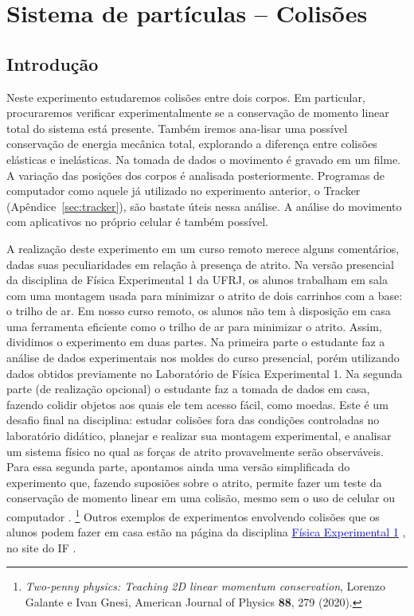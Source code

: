 
\chapter{Sistema de partículas -- Colisões}
\label{chap:colisao}
\vspace{-0.7cm}



\section{Introdução}
Neste experimento estudaremos colisões entre dois corpos. Em particular, procuraremos verificar experimentalmente se a conservação de momento linear total do sistema está presente. Também iremos ana-lisar uma possível conservação de energia mecânica total, explorando a diferença entre colisões elásticas e inelásticas. Na tomada de dados o movimento é gravado em um filme. A variação das posições dos corpos é analisada posteriormente. Programas de computador como aquele já utilizado no experimento anterior, o Tracker 
(Apêndice~\ref{sec:tracker}), são bastate úteis nessa análise. A análise do movimento com aplicativos no próprio celular é também possível.

A realização deste experimento em um curso remoto merece alguns comentários, dadas suas peculiaridades em relação à presença de atrito. Na versão presencial da disciplina de Física Experimental 1 da UFRJ, os alunos trabalham em sala com uma montagem usada para minimizar o atrito de dois carrinhos com a base: o trilho de ar. Em nosso curso remoto, os alunos não tem à disposição em casa uma ferramenta eficiente como o trilho de ar para minimizar o atrito. Assim, dividimos o experimento em duas partes. Na primeira parte o estudante faz a análise de dados experimentais nos moldes do curso presencial, porém utilizando dados obtidos previamente no Laboratório de Física Experimental 1. Na segunda parte (de realização opcional) o estudante faz a tomada de dados em casa, fazendo colidir objetos aos quais ele tem acesso fácil, como moedas. Este é um desafio final na disciplina: estudar colisões fora das condições controladas no laboratório didático, planejar e realizar sua montagem experimental, e analisar um sistema físico no qual as forças de atrito provavelmente serão observáveis. Para essa segunda parte, apontamos ainda uma versão simplificada do experimento que, fazendo suposiões sobre o atrito, permite fazer um teste da conservação de momento linear em uma colisão, mesmo sem o uso de celular ou computador \cite{Galante2020}. \footnote{{\it Two-penny physics: Teaching 2D linear momentum conservation}, Lorenzo Galante e Ivan Gnesi, American Journal of Physics {\bf88}, 279 (2020).} Outros exemplos de experimentos envolvendo colisões que os alunos podem fazer em casa estão na página da disciplina  \href{https://fisexp1.if.ufrj.br}{\textcolor {blue} {Física Experimental 1}} , no site do IF . 


